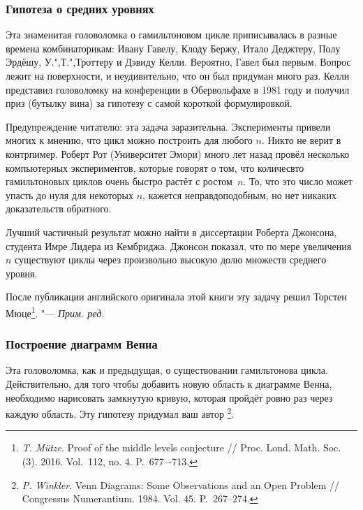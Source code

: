 \documentclass[twoside]{book}
\newenvironment{addedbytheeditors}{\par\medskip\small
}{\par\addvspace{\medskipamount}} %
\begin{document}
\subsubsection*{Гипотеза о средних уровнях}

Эта знаменитая головоломка о гамильтоновом цикле приписывалась в
разные времена комбинаторикам: Ивану Гавелу, Клоду Бержу, Итало
Деджтеру, Полу Эрдёшу, У.",Т.",Троттеру и Дэвиду Келли.
Вероятно, Гавел был первым.
Вопрос лежит на поверхности, и неудивительно, что
он был придуман много раз.
Келли представил головоломку на
конференции в Обервольфахе в 1981 году и получил приз (бутылку вина)
за гипотезу с самой короткой формулировкой.


Предупреждение читателю: эта задача заразительна.
Эксперименты
привели многих к мнению, что цикл можно построить для любого $n$.
Никто не верит в контрпимер.
Роберт Рот (Университет Эмори) много лет
назад провёл несколько компьютерных экспериментов, которые говорят о
том, что количесвто гамильтоновых циклов очень быстро растёт с
ростом~$n$.
То, что это число может упасть до нуля для некоторых $n$,
кажется неправдоподобным, но нет никаких доказательств обратного.

Лучший частичный результат можно найти в диссертации Роберта Джонсона, студента Имре Лидера из Кембриджа.
Джонсон показал, что по мере увеличения $n$ существуют циклы через произвольно высокую долю множеств среднего уровня.

\begin{addedbytheeditors}
После публикации английского оригинала этой книги эту задачу решил Торстен Мюце\footnote{\emph{T. Mütze}. 
Proof of the middle levels conjecture /\!/
{Proc. Lond. Math. Soc.} (3). 2016. Vol.~112, no. 4. P.~677–-713.}.
"--- \emph{Прим. ред.}
\end{addedbytheeditors}

\subsubsection*{Построение диаграмм Венна}

Эта головоломка, как и предыдущая, о существовании гамильтонова цикла. 
Действительно, для того чтобы добавить новую область к диаграмме Венна, необходимо нарисовать замкнутую кривую, которая пройдёт ровно раз через каждую область.
Эту гипотезу придумал ваш автор%
\footnote{\emph{P. Winkler}. Venn Diagrams: Some Observations and an Open Problem /\!/ {Congressus Numerantium}. 1984. Vol. 45. P.~267--274.}.
\end{document}
